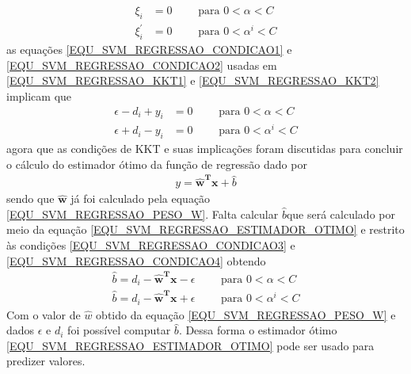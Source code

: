 \begin{align}
\xi_{i}  &= 0		\qquad \textrm{ para } 0 < \alpha < C		\label{EQU_SVM_REGRESSAO_CONDICAO1}\\
\xi_{i}^{'} &= 0	\qquad \textrm{ para }  0 < \alpha^{i} < C	\label{EQU_SVM_REGRESSAO_CONDICAO2}
\end{align}
as equações \eqref{EQU_SVM_REGRESSAO_CONDICAO1} e \eqref{EQU_SVM_REGRESSAO_CONDICAO2} usadas em \eqref{EQU_SVM_REGRESSAO_KKT1} e \eqref{EQU_SVM_REGRESSAO_KKT2} implicam que  
\begin{align}
\epsilon  - d_{i} + y_{i} &= 0	\qquad \textrm{ para } 0 < \alpha < C		\label{EQU_SVM_REGRESSAO_CONDICAO3}\\
\epsilon  + d_{i} - y_{i} &= 0	\qquad \textrm{ para }  0 < \alpha^{i} < C	\label{EQU_SVM_REGRESSAO_CONDICAO4}
\end{align}
agora que as condições de KKT e suas implicações foram discutidas para concluir o cálculo do estimador ótimo da função de regressão 
dado por 
\begin{align}
y = \mathbf{\hat{w}^{T}x} + \hat{b} \label{EQU_SVM_REGRESSAO_ESTIMADOR_OTIMO}
\end{align}
sendo que \(\mathbf{\hat{w}}\) já foi calculado pela equação \eqref{EQU_SVM_REGRESSAO_PESO_W}. Falta calcular \(\hat{b}\)que será calculado por meio da equação \eqref{EQU_SVM_REGRESSAO_ESTIMADOR_OTIMO} e restrito às condições \eqref{EQU_SVM_REGRESSAO_CONDICAO3} e \eqref{EQU_SVM_REGRESSAO_CONDICAO4} obtendo
\begin{align}
\hat{b} = d_{i} - \mathbf{\hat{w}^{T}x} -\epsilon	\qquad \textrm{ para } 0 < \alpha < C		\label{EQU_SVM_REGRESSAO_CONDICAO6}\\
\hat{b} = d_{i} - \mathbf{\hat{w}^{T}x} +\epsilon	\qquad \textrm{ para }  0 < \alpha^{i} < C	\label{EQU_SVM_REGRESSAO_CONDICAO7}
\end{align}
Com o valor de \(\hat{w}\) obtido da equação \eqref{EQU_SVM_REGRESSAO_PESO_W} e dados \(\epsilon\) e \(d_{i}\) foi possível computar \(\hat{b}\). Dessa forma o estimador ótimo \eqref{EQU_SVM_REGRESSAO_ESTIMADOR_OTIMO} pode ser usado para predizer valores.

